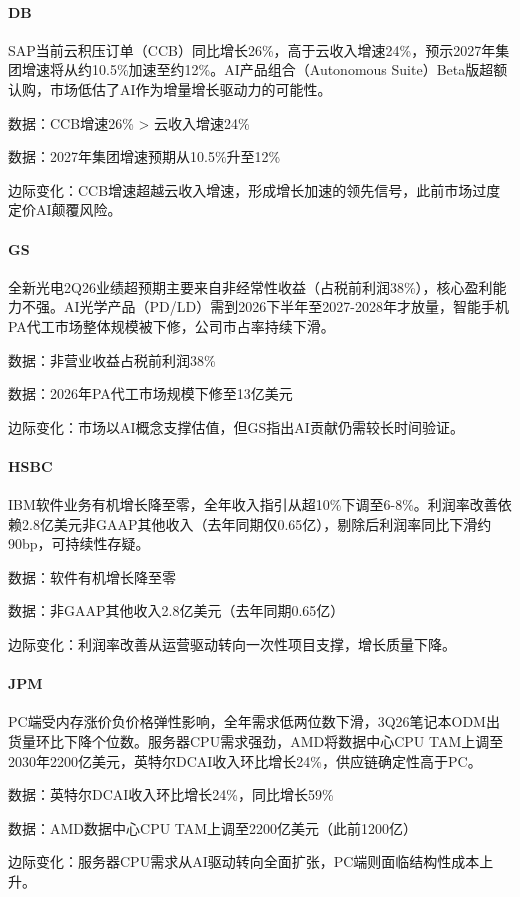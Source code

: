 \documentclass[11pt]{ctexart}
\begin{document}
\paragraph{DB} SAP当前云积压订单（CCB）同比增长26\%，高于云收入增速24\%，预示2027年集团增速将从约10.5\%加速至约12\%。AI产品组合（Autonomous Suite）Beta版超额认购，市场低估了AI作为增量增长驱动力的可能性。
{\small\color{refgray}数据：CCB增速26\% > 云收入增速24\%\par}
{\small\color{refgray}数据：2027年集团增速预期从10.5\%升至12\%\par}
{\small\color{refgray}边际变化：CCB增速超越云收入增速，形成增长加速的领先信号，此前市场过度定价AI颠覆风险。\par}
\paragraph{GS} 全新光电2Q26业绩超预期主要来自非经常性收益（占税前利润38\%），核心盈利能力不强。AI光学产品（PD/LD）需到2026下半年至2027-2028年才放量，智能手机PA代工市场整体规模被下修，公司市占率持续下滑。
{\small\color{refgray}数据：非营业收益占税前利润38\%\par}
{\small\color{refgray}数据：2026年PA代工市场规模下修至13亿美元\par}
{\small\color{refgray}边际变化：市场以AI概念支撑估值，但GS指出AI贡献仍需较长时间验证。\par}
\paragraph{HSBC} IBM软件业务有机增长降至零，全年收入指引从超10\%下调至6-8\%。利润率改善依赖2.8亿美元非GAAP其他收入（去年同期仅0.65亿），剔除后利润率同比下滑约90bp，可持续性存疑。
{\small\color{refgray}数据：软件有机增长降至零\par}
{\small\color{refgray}数据：非GAAP其他收入2.8亿美元（去年同期0.65亿）\par}
{\small\color{refgray}边际变化：利润率改善从运营驱动转向一次性项目支撑，增长质量下降。\par}
\paragraph{JPM} PC端受内存涨价负价格弹性影响，全年需求低两位数下滑，3Q26笔记本ODM出货量环比下降个位数。服务器CPU需求强劲，AMD将数据中心CPU TAM上调至2030年2200亿美元，英特尔DCAI收入环比增长24\%，供应链确定性高于PC。
{\small\color{refgray}数据：英特尔DCAI收入环比增长24\%，同比增长59\%\par}
{\small\color{refgray}数据：AMD数据中心CPU TAM上调至2200亿美元（此前1200亿）\par}
{\small\color{refgray}边际变化：服务器CPU需求从AI驱动转向全面扩张，PC端则面临结构性成本上升。\par}
\end{document}
